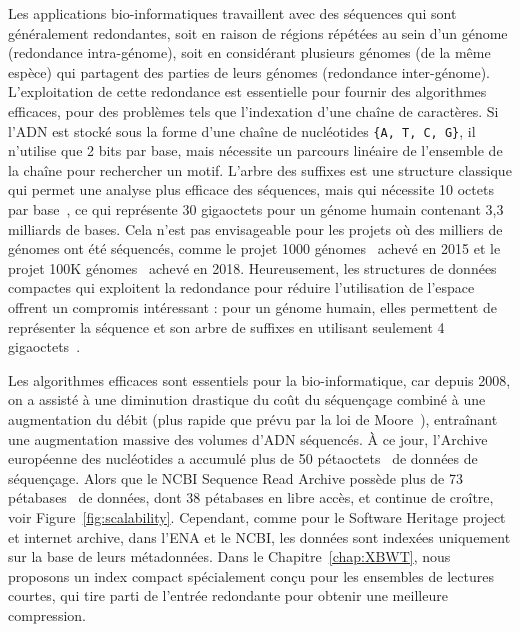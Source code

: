 Les applications bio-informatiques travaillent avec des séquences qui sont généralement redondantes, soit en raison de régions répétées au sein d'un génome (redondance intra-génome), soit en considérant plusieurs génomes (de la même espèce) qui partagent des parties de leurs génomes (redondance inter-génome).
L'exploitation de cette redondance est essentielle pour fournir des algorithmes efficaces, pour des problèmes tels que l'indexation d'une chaîne de caractères.
Si l'ADN est stocké sous la forme d'une chaîne de nucléotides \texttt{\{A, T, C, G\}}, il n'utilise que 2 bits par base, mais nécessite un parcours linéaire de l'ensemble de la chaîne pour rechercher un motif. 
L'arbre des suffixes est une structure classique qui permet une analyse plus efficace des séquences, mais qui nécessite 10 octets par base~\cite{navarro2016compact}, ce qui représente 30 gigaoctets pour un génome humain contenant 3,3 milliards de bases. 
Cela n'est pas envisageable pour les projets où des milliers de génomes ont été séquencés, comme le projet 1000 génomes~\cite{10002015global} achevé en 2015 et le projet 100K génomes~\cite{100Kgenomes} achevé en 2018. 
Heureusement, les structures de données compactes qui exploitent la redondance pour réduire l'utilisation de l'espace offrent un compromis intéressant : pour un génome humain, elles permettent de représenter la séquence et son arbre de suffixes en utilisant seulement 4 gigaoctets~\cite{navarro2016compact}.

Les algorithmes efficaces sont essentiels pour la bio-informatique, car depuis 2008, on a assisté à une diminution drastique du coût du séquençage combiné à une augmentation du débit (plus rapide que prévu par la loi de Moore~\cite{muir2016real}), entraînant une augmentation massive des volumes d'ADN séquencés. 
À ce jour, l'Archive européenne des nucléotides a accumulé plus de 50 pétaoctets~\cite{ena} de données de séquençage.
Alors que le NCBI Sequence Read Archive possède plus de 73 pétabases~\cite{sra} de données, dont 38 pétabases en libre accès, et continue de croître, voir Figure~\ref{fig:scalability}. Cependant, comme pour le Software Heritage project et internet archive, dans l'ENA et le NCBI, les données sont indexées uniquement sur la base de leurs métadonnées.
Dans le Chapitre~\ref{chap:XBWT}, nous proposons un index compact spécialement conçu pour les ensembles de lectures courtes, qui tire parti de l'entrée redondante pour obtenir une meilleure compression.

